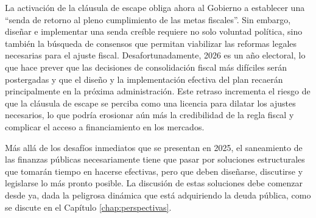 La activación de la cláusula de escape obliga ahora al Gobierno a establecer una ``senda de retorno al pleno cumplimiento de las metas fiscales''. Sin embargo, diseñar e implementar una senda creíble requiere no solo voluntad política, sino también la búsqueda de consensos que permitan viabilizar las reformas legales necesarias para el ajuste fiscal. Desafortunadamente, 2026 es un año electoral, lo que hace prever que las decisiones de consolidación fiscal más difíciles serán postergadas y que el diseño y la implementación efectiva del plan recaerán principalmente en la próxima administración. Este retraso incrementa el riesgo de que la cláusula de escape se perciba como una licencia para dilatar los ajustes necesarios, lo que podría erosionar aún más la credibilidad de la regla fiscal y complicar el acceso a financiamiento en los mercados.


Más allá de los desafíos inmediatos que se presentan en 2025, el saneamiento de las finanzas públicas necesariamente tiene que pasar por soluciones estructurales que tomarán tiempo en hacerse efectivas, pero que deben diseñarse, discutirse y legislarse lo más pronto posible. La discusión de estas soluciones debe comenzar desde ya, dada la peligrosa dinámica que está adquiriendo la deuda pública, como se discute en el Capítulo \ref{chap:perspectivas}.

